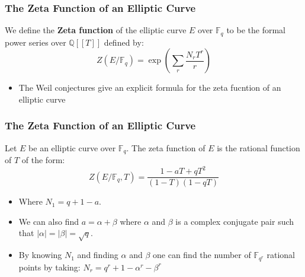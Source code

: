 \documentclass{beamer}
\newcommand{\Q}{\mathbb{Q}}
\newcommand{\F}{\mathbb{F}}
\theoremstyle{plain} %
\theoremstyle{definition}
\theoremstyle{remark}
\begin{document}
\begin{frame}
\frametitle{The Zeta Function of an Elliptic Curve}
    
\begin{definition}
    We define the \textbf{Zeta function} of the elliptic curve $E$ over $\F_q$ to be the formal power series over $\Q[[T]]$ defined by:
    \begin{equation}
        Z(E/\F_q)=\exp{(\sum_{r} \frac{N_rT^r}{r})}
    \end{equation}
\end{definition}

\begin{itemize}
    \item The Weil conjectures give an explicit formula for the zeta fucntion of an elliptic curve
\end{itemize}


\end{frame}


\begin{frame}
\frametitle{The Zeta Function of an Elliptic Curve}
    
\begin{theorem}
    Let $E$ be an elliptic curve over $\F_q$. The zeta function of $E$ is the rational function of $T$ of the form:
        \begin{equation}
            Z(E/\F_q,T)=\frac{1-aT+qT^2}{(1-T)(1-qT)}
        \end{equation}
\end{theorem}

\begin{itemize}
    \item Where $N_1=q+1-a$.
    
    \item We can also find $a=\alpha+\beta$ where $\alpha$ and $\beta$ is a complex conjugate pair such that $|\alpha|=|\beta|=\sqrt{q}$.
    
    \item By knowing $N_1$ and finding $\alpha$ and $\beta$ one can find the number of $\F_{q^r}$ rational points by taking: $N_r=q^r+1-\alpha^r-\beta^r$
\end{itemize}


\end{frame}
\end{document}
